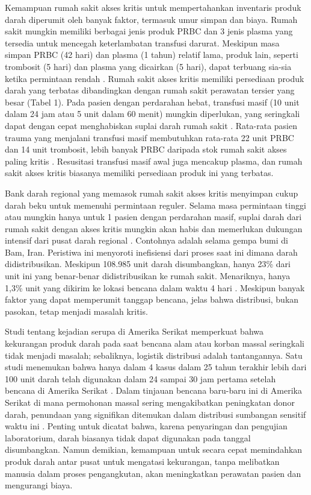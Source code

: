 Kemampuan rumah sakit akses kritis untuk mempertahankan inventaris produk darah diperumit oleh banyak faktor, termasuk umur simpan dan biaya. Rumah sakit mungkin memiliki berbagai jenis produk PRBC dan 3 jenis plasma yang tersedia untuk mencegah keterlambatan transfusi darurat. Meskipun masa simpan PRBC (42 hari) dan plasma (1 tahun) relatif lama, produk lain, seperti trombosit (5 hari) dan plasma yang dicairkan (5 hari), dapat terbuang sia-sia ketika permintaan rendah \citep{redcross2014}. Rumah sakit akses kritis memiliki persediaan produk darah yang terbatas dibandingkan dengan rumah sakit perawatan tersier yang besar (Tabel 1). Pada pasien dengan perdarahan hebat, transfusi masif (10 unit dalam 24 jam atau 5 unit dalam 60 menit) mungkin diperlukan, yang seringkali dapat dengan cepat menghabiskan suplai darah rumah sakit \citep{krumrei2012comparison}. Rata-rata pasien trauma yang menjalani transfusi masif membutuhkan rata-rata 22 unit PRBC dan 14 unit trombosit, lebih banyak PRBC daripada stok rumah sakit akses paling kritis \citep{holcomb2011increased}. Resusitasi transfusi masif awal juga mencakup plasma, dan rumah sakit akses kritis biasanya memiliki persediaan produk ini yang terbatas. 

Bank darah regional yang memasok rumah sakit akses kritis menyimpan cukup darah beku untuk memenuhi permintaan reguler. Selama masa permintaan tinggi atau mungkin hanya untuk 1 pasien dengan perdarahan masif, suplai darah dari rumah sakit dengan akses kritis mungkin akan habis dan memerlukan dukungan intensif dari pusat darah regional \citep{schmidt2002blood} \citep{erickson2008management}. Contohnya adalah selama gempa bumi di Bam, Iran. Peristiwa ini menyoroti inefisiensi dari proses saat ini dimana darah didistribusikan. Meskipun 108.985 unit darah disumbangkan, hanya 23\% dari unit ini yang benar-benar didistribusikan ke rumah sakit. Menariknya, hanya 1,3\% unit yang dikirim ke lokasi bencana dalam waktu 4 hari \citep{abolghasemi2008revisiting} . Meskipun banyak faktor yang dapat memperumit tanggap bencana, jelas bahwa distribusi, bukan pasokan, tetap menjadi masalah kritis.

Studi tentang kejadian serupa di Amerika Serikat memperkuat bahwa kekurangan produk darah pada saat bencana alam atau korban massal seringkali tidak menjadi masalah; sebaliknya, logistik distribusi adalah tantangannya. Satu studi menemukan bahwa hanya dalam 4 kasus dalam 25 tahun terakhir lebih dari 100 unit darah telah digunakan dalam 24 sampai 30 jam pertama setelah bencana di Amerika Serikat \citep{schmidt2002blood} \citep{abolghasemi2008revisiting}. Dalam tinjauan bencana baru-baru ini di Amerika Serikat di mana permohonan massal sering mengakibatkan peningkatan donor darah, penundaan yang signifikan ditemukan dalam distribusi sumbangan sensitif waktu ini \citep{klein2001earthquake}. Penting untuk dicatat bahwa, karena penyaringan dan pengujian laboratorium, darah biasanya tidak dapat digunakan pada tanggal disumbangkan. Namun demikian, kemampuan untuk secara cepat memindahkan produk darah antar pusat untuk mengatasi kekurangan, tanpa melibatkan manusia dalam proses pengangkutan, akan meningkatkan perawatan pasien dan mengurangi biaya.


